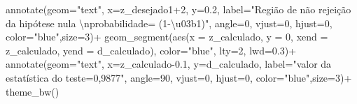 \documentclass[
]{book}
\newenvironment{Shaded}{\begin{snugshade}}{\end{snugshade}}
\newcommand{\AttributeTok}[1]{\textcolor[rgb]{0.77,0.63,0.00}{#1}}
\newcommand{\DecValTok}[1]{\textcolor[rgb]{0.00,0.00,0.81}{#1}}
\newcommand{\FloatTok}[1]{\textcolor[rgb]{0.00,0.00,0.81}{#1}}
\newcommand{\FunctionTok}[1]{\textcolor[rgb]{0.00,0.00,0.00}{#1}}
\newcommand{\NormalTok}[1]{#1}
\newcommand{\SpecialCharTok}[1]{\textcolor[rgb]{0.00,0.00,0.00}{#1}}
\newcommand{\StringTok}[1]{\textcolor[rgb]{0.31,0.60,0.02}{#1}}
\begin{document}
\begin{Shaded}
\begin{Highlighting}[]
  \FunctionTok{annotate}\NormalTok{(}\AttributeTok{geom=}\StringTok{"text"}\NormalTok{, }\AttributeTok{x=}\NormalTok{z\_desejado1}\SpecialCharTok{+}\DecValTok{2}\NormalTok{, }\AttributeTok{y=}\FloatTok{0.2}\NormalTok{, }\AttributeTok{label=}\StringTok{"Região de não rejeição da hipótese nula }\SpecialCharTok{\textbackslash{}n}\StringTok{probabilidade= (1{-}\textbackslash{}u03b1)"}\NormalTok{, }\AttributeTok{angle=}\DecValTok{0}\NormalTok{, }\AttributeTok{vjust=}\DecValTok{0}\NormalTok{, }\AttributeTok{hjust=}\DecValTok{0}\NormalTok{, }\AttributeTok{color=}\StringTok{"blue"}\NormalTok{,}\AttributeTok{size=}\DecValTok{3}\NormalTok{)}\SpecialCharTok{+}
  \FunctionTok{geom\_segment}\NormalTok{(}\FunctionTok{aes}\NormalTok{(}\AttributeTok{x =}\NormalTok{ z\_calculado, }\AttributeTok{y =} \DecValTok{0}\NormalTok{, }\AttributeTok{xend =}\NormalTok{ z\_calculado, }\AttributeTok{yend =}\NormalTok{ d\_calculado), }\AttributeTok{color=}\StringTok{"blue"}\NormalTok{, }\AttributeTok{lty=}\DecValTok{2}\NormalTok{, }\AttributeTok{lwd=}\FloatTok{0.3}\NormalTok{)}\SpecialCharTok{+}
  \FunctionTok{annotate}\NormalTok{(}\AttributeTok{geom=}\StringTok{"text"}\NormalTok{, }\AttributeTok{x=}\NormalTok{z\_calculado}\FloatTok{{-}0.1}\NormalTok{, }\AttributeTok{y=}\NormalTok{d\_calculado, }\AttributeTok{label=}\StringTok{"valor da estatística do teste=0,9877"}\NormalTok{, }\AttributeTok{angle=}\DecValTok{90}\NormalTok{, }\AttributeTok{vjust=}\DecValTok{0}\NormalTok{, }\AttributeTok{hjust=}\DecValTok{0}\NormalTok{, }\AttributeTok{color=}\StringTok{"blue"}\NormalTok{,}\AttributeTok{size=}\DecValTok{3}\NormalTok{)}\SpecialCharTok{+}
  \FunctionTok{theme\_bw}\NormalTok{()}
\end{Highlighting}
\end{Shaded}
\end{document}
